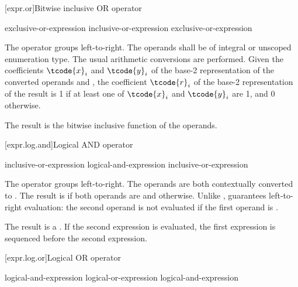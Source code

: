 [expr.or]{Bitwise inclusive OR operator}%
%
%

\begin{bnf}
\br
    exclusive-or-expression\br
    inclusive-or-expression \terminal{|} exclusive-or-expression
\end{bnf}

\pnum
The \tcode{|} operator groups left-to-right.
The operands shall be of integral or unscoped enumeration type.
The usual arithmetic conversions are performed.
Given the coefficients $\tcode{x}_i$ and $\tcode{y}_i$
of the base-2 representation
of the converted operands  and ,
the coefficient $\tcode{r}_i$
of the base-2 representation of the result 
is 1 if at least one of $\tcode{x}_i$ and $\tcode{y}_i$ are 1, and 0 otherwise.
\begin{note}
The result is the bitwise inclusive  function of the operands.
\end{note}

[expr.log.and]{Logical AND operator}%
%
%
%

\begin{bnf}
\br
    inclusive-or-expression\br
    logical-and-expression \terminal{\&\&} inclusive-or-expression
\end{bnf}

\pnum
The \tcode{\&\&} operator groups left-to-right. The operands are both
contextually converted to .
The
result is  if both operands are  and
 otherwise. Unlike \tcode{\&}, \tcode{\&\&} guarantees
left-to-right evaluation: the second operand is not evaluated if the
first operand is .

\pnum
The result is a .
%
If the second expression is evaluated,
the first expression is sequenced before
the second expression.

[expr.log.or]{Logical OR operator}%
%
%
%

\begin{bnf}
\br
    logical-and-expression\br
    logical-or-expression \terminal{||} logical-and-expression
\end{bnf}

